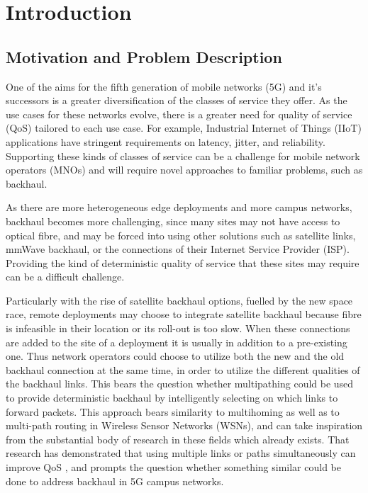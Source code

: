 
\cleardoublepage
\chapter{Introduction}

\label{cha:introduction}

\section{Motivation and Problem Description}
\label{sec:motivation}

One of the aims for the fifth generation of mobile networks (5G) and it's successors is a greater diversification of the classes of service they offer. As the use cases for these networks evolve, there is a greater need for quality of service (QoS) tailored to each use case. For example, Industrial Internet of Things (IIoT) applications have stringent requirements on latency, jitter, and reliability. Supporting these kinds of classes of service can be a challenge for mobile network operators (MNOs) and will require novel approaches to familiar problems, such as backhaul.

As there are more heterogeneous edge deployments and more campus networks, backhaul becomes more challenging, since many sites may not have access to optical fibre, and may be forced into using other solutions such as satellite links, mmWave backhaul, or the connections of their Internet Service Provider (ISP). Providing the kind of deterministic quality of service that these sites may require can be a difficult challenge.

Particularly with the rise of satellite backhaul options, fuelled by the new space race, remote deployments may choose to integrate satellite backhaul because fibre is infeasible in their location or its roll-out is too slow. When these connections are added to the site of a deployment it is usually in addition to a pre-existing one. Thus network operators could choose to utilize both the new and the old backhaul connection at the same time, in order to utilize the different qualities of the backhaul links. This bears the question whether multipathing could be used to provide deterministic backhaul by intelligently selecting on which links to forward packets. This approach bears similarity to multihoming as well as to multi-path routing in Wireless Sensor Networks (WSNs), and can take inspiration from the substantial body of research in these fields which already exists. That research has demonstrated that using multiple links or paths simultaneously can improve QoS \cite{akella2003measurement, tao2005improving, habib2007improving, goldenberg2004optimizing, huang2008multiconstrained, akella2008performance}, and prompts the question whether something similar could be done to address backhaul in 5G campus networks.


